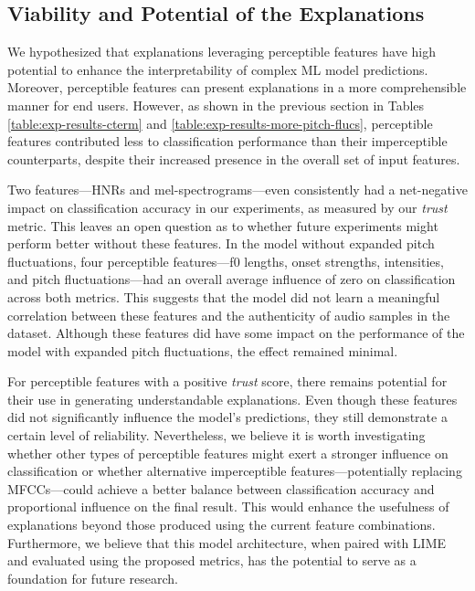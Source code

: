 \documentclass{article}
\begin{document}
\subsection{Viability and Potential of the Explanations}

We hypothesized that explanations leveraging perceptible features have high potential to enhance the interpretability of complex ML model predictions. Moreover, perceptible features can present explanations in a more comprehensible manner for end users. However, as shown in the previous section in Tables \ref{table:exp-results-cterm} and \ref{table:exp-results-more-pitch-flucs}, perceptible features contributed less to classification performance than their imperceptible counterparts, despite their increased presence in the overall set of input features.

Two features—HNRs and mel-spectrograms—even consistently had a net-negative impact on classification accuracy in our experiments, as measured by our \textit{trust} metric. This leaves an open question as to whether future experiments might perform better without these features. In the model without expanded pitch fluctuations, four perceptible features—f0 lengths, onset strengths, intensities, and pitch fluctuations—had an overall average influence of zero on classification across both metrics. This suggests that the model did not learn a meaningful correlation between these features and the authenticity of audio samples in the dataset. Although these features did have some impact on the performance of the model with expanded pitch fluctuations, the effect remained minimal.

For perceptible features with a positive \textit{trust} score, there remains potential for their use in generating understandable explanations. Even though these features did not significantly influence the model’s predictions, they still demonstrate a certain level of reliability. Nevertheless, we believe it is worth investigating whether other types of perceptible features might exert a stronger influence on classification or whether alternative imperceptible features—potentially replacing MFCCs—could achieve a better balance between classification accuracy and proportional influence on the final result. This would enhance the usefulness of explanations beyond those produced using the current feature combinations. Furthermore, we believe that this model architecture, when paired with LIME and evaluated using the proposed metrics, has the potential to serve as a foundation for future research.
\end{document}
